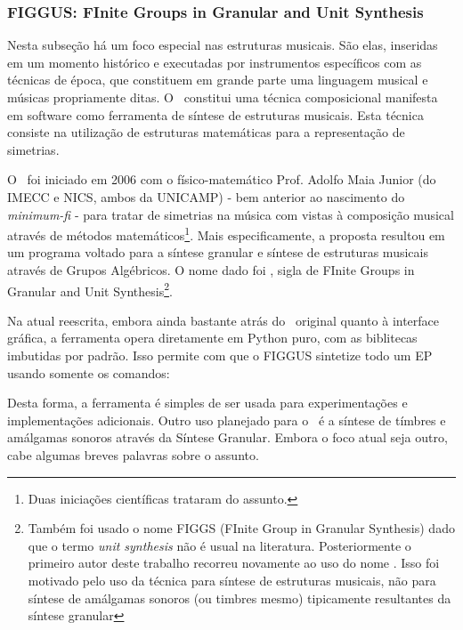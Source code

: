 \vspace{10 mm}

\subsubsection{FIGGUS: FInite Groups in Granular and Unit Synthesis}

Nesta subseção há um foco especial nas estruturas musicais.
São elas, inseridas em um momento histórico e
executadas por instrumentos específicos com as técnicas de época,
que constituem em grande parte uma linguagem musical e músicas propriamente
ditas. O \figgus\ constitui uma técnica composicional
manifesta em software como ferramenta de síntese de
estruturas musicais. Esta técnica
consiste na utilização de estruturas matemáticas
para a representação de simetrias.

O \figgus\ foi iniciado em 2006 com o físico-matemático Prof. Adolfo Maia Junior (do IMECC e NICS, ambos da UNICAMP) - bem anterior
ao nascimento do \emph{minimum-fi} - para
tratar de simetrias na música com vistas à composição musical através
de métodos matemáticos\footnote{Duas iniciações científicas trataram do assunto.}. Mais especificamente, a proposta resultou em
um programa voltado para a síntese
granular e síntese de estruturas musicais através de Grupos Algébricos. O nome dado
foi \figgus, sigla de FInite Groups in Granular and Unit Synthesis\footnote{Também foi usado
o nome FIGGS (FInite Group in Granular Synthesis) dado que o termo \emph{unit synthesis} não
é usual na literatura. Posteriormente o primeiro autor deste trabalho recorreu novamente
ao uso do nome \figgus. Isso foi motivado pelo
uso da técnica para síntese de estruturas musicais, não para
síntese de amálgamas sonoros (ou timbres mesmo) tipicamente resultantes da síntese granular}.

Na atual reescrita, embora ainda bastante atrás do \figgus\ original quanto
à interface gráfica, a ferramenta opera diretamente em Python puro,
com as biblitecas imbutidas por padrão. Isso permite com que o FIGGUS
sintetize todo um EP usando somente os comandos:


Desta forma, a ferramenta 
é simples de ser usada para experimentações
e implementações adicionais.
Outro uso planejado para o \figgus\
é a síntese de tímbres e amálgamas sonoros através da
Síntese Granular. Embora o foco atual seja outro, cabe algumas breves
palavras sobre o assunto.

